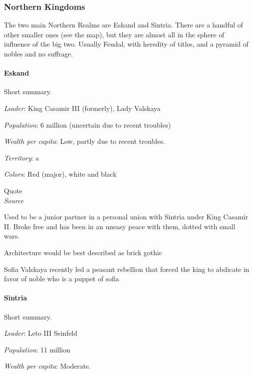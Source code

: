 \subsubsection{Northern Kingdoms}

The two main Northern Realms are Eskand and Sintria. There are a handful of other smaller ones (see the map), but they are almost all in the sphere of influence of the big two. Usually Feudal, with heredity of titles, and a pyramid of nobles and no suffrage.

\paragraph{Eskand}


Short summary.


\textit{Leader}: King Casamir III (formerly), Lady Valskaya

\textit{Population}: 6 million (uncertain due to recent troubles)

\textit{Wealth per capita}: Low, partly due to recent troubles.

\textit{Territory}: a
    
\textit{Colors}: Red (major), white and black


\begin{rpg-quotebox}
Quote \\ \textendash \textit{Source}
\end{rpg-quotebox}



Used to be a junior partner in a personal union with Sintria under King Casamir II.
Broke free and has been in an uneasy peace with them, dotted with small wars.
    

Architecture would be best described as brick gothic



Sofia Valskaya recently led a peasant rebellion that forced the king to abdicate in favor of noble who is a puppet of sofia



\paragraph{Sintria}

Short summary.

\textit{Leader}: Leto III Seinfeld

\textit{Population}: 11 million

\textit{Wealth per capita}: Moderate.

